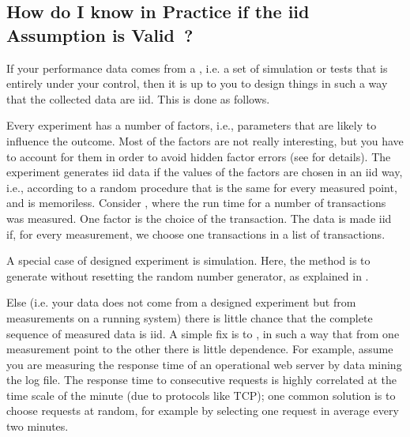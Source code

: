 %
\subsection{How do I know in Practice if the iid Assumption is
Valid~?} If your performance data comes from a , i.e. a set of simulation or tests that is entirely
under your control, then it is up to you to design things in
such a way that the collected data are iid. This is done as
follows.

Every experiment has a number of factors, i.e., parameters that
are likely to influence the outcome. Most of the factors are
not really interesting, but you have to account for them in
order to avoid hidden factor errors (see  for
details). The experiment generates iid data if the values of
the factors are chosen in an iid way, i.e., according to a
random procedure that is the same for every measured point, and
is memoriless. Consider , where the run time
for a number of transactions was measured. One factor is the
choice of the transaction. The data is made iid if, for every
measurement, we choose one transactions  in a list of transactions.

A special case of designed experiment is
simulation. Here, the method is to generate
 without resetting the random
number generator, as explained in
.

Else (i.e. your data does not come from a designed experiment
but from measurements on a running system) there is little
chance that the complete sequence of measured data is iid. A
simple fix is to , in such  a
way that from one measurement point to the other there is
little dependence. For example, assume you are measuring the
response time of an operational web server by data mining the
log file. The response time to consecutive requests is highly
correlated at the time scale of the minute (due to protocols
like TCP); one common solution is to choose requests at random,
for example by selecting one request in average every two
minutes.

